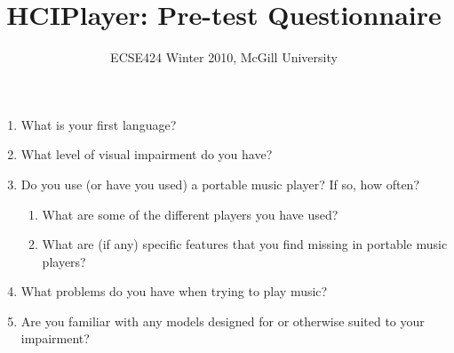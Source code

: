 \documentclass[10pt,letterpaper]{article}
\begin{document}
\title{HCIPlayer: Pre-test Questionnaire}
\author{ECSE424 Winter 2010, McGill University}
\renewcommand{\today}{Updated: Monday, March 8th, 2010}
\maketitle

\begin{enumerate}

\item{What is your first language?}

\item{What level of visual impairment do you have?}

\item{Do you use (or have you used) a portable music player? If so, how often?}

\begin{enumerate}

	\item{What are some of the different players you have used?}
	\item{What are (if any) specific features that you find missing in portable music players?}

\end{enumerate}

\item{What problems do you have when trying to play music?}

\item{Are you familiar with any models designed for or otherwise suited to your impairment?}

\end{enumerate}
\end{document}
